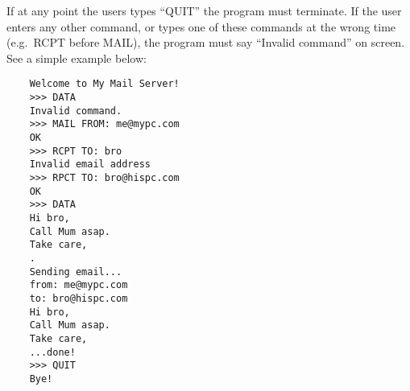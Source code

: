 \documentclass{article}
\begin{document}
If at any point the users types ``QUIT'' the program must
terminate. If the user enters any other command, or types one of these
commands at the wrong time (e.g.~RCPT before MAIL), the program must
say ``Invalid command'' on screen. See a simple example below: 

\begin{verbatim}
    Welcome to My Mail Server!
    >>> DATA
    Invalid command. 
    >>> MAIL FROM: me@mypc.com
    OK
    >>> RCPT TO: bro
    Invalid email address
    >>> RPCT TO: bro@hispc.com
    OK
    >>> DATA
    Hi bro, 
    Call Mum asap.
    Take care,
    .
    Sending email...
    from: me@mypc.com
    to: bro@hispc.com
    Hi bro, 
    Call Mum asap.
    Take care,
    ...done!
    >>> QUIT
    Bye!    
\end{verbatim}
\end{document}
